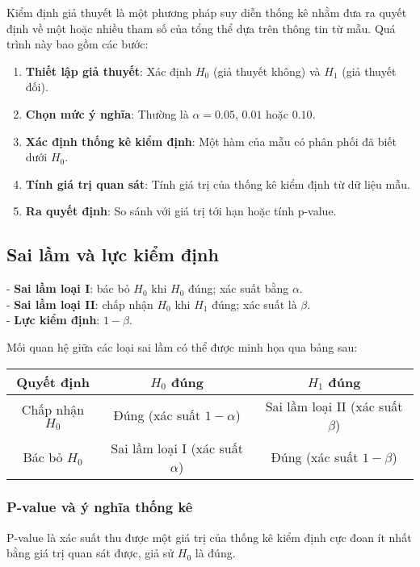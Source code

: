 Kiểm định giả thuyết là một phương pháp suy diễn thống kê nhằm đưa ra quyết định về một hoặc nhiều tham số của tổng thể dựa trên thông tin từ mẫu. Quá trình này bao gồm các bước:

\begin{enumerate}
    \item \textbf{Thiết lập giả thuyết}: Xác định $H_0$ (giả thuyết không) và $H_1$ (giả thuyết đối).
    \item \textbf{Chọn mức ý nghĩa}: Thường là $\alpha = 0.05$, $0.01$ hoặc $0.10$.
    \item \textbf{Xác định thống kê kiểm định}: Một hàm của mẫu có phân phối đã biết dưới $H_0$.
    \item \textbf{Tính giá trị quan sát}: Tính giá trị của thống kê kiểm định từ dữ liệu mẫu.
    \item \textbf{Ra quyết định}: So sánh với giá trị tới hạn hoặc tính p-value.
\end{enumerate}

\subsection{Sai lầm và lực kiểm định}
\begin{tinhchat}
- \textbf{Sai lầm loại I}: bác bỏ $H_0$ khi $H_0$ đúng; xác suất bằng $\alpha$.\\
- \textbf{Sai lầm loại II}: chấp nhận $H_0$ khi $H_1$ đúng; xác suất là $\beta$.\\
- \textbf{Lực kiểm định}: $1-\beta$.
\end{tinhchat}

Mối quan hệ giữa các loại sai lầm có thể được minh họa qua bảng sau:

\begin{center}
\begin{tabular}{|c|c|c|}
\hline
\textbf{Quyết định} & \textbf{$H_0$ đúng} & \textbf{$H_1$ đúng} \\
\hline
Chấp nhận $H_0$ & Đúng (xác suất $1-\alpha$) & Sai lầm loại II (xác suất $\beta$) \\
\hline
Bác bỏ $H_0$ & Sai lầm loại I (xác suất $\alpha$) & Đúng (xác suất $1-\beta$) \\
\hline
\end{tabular}
\end{center}

\subsubsection*{P-value và ý nghĩa thống kê}
\begin{dn}[P-value]
P-value là xác suất thu được một giá trị của thống kê kiểm định cực đoan ít nhất bằng giá trị quan sát được, giả sử $H_0$ là đúng.
\end{dn}


